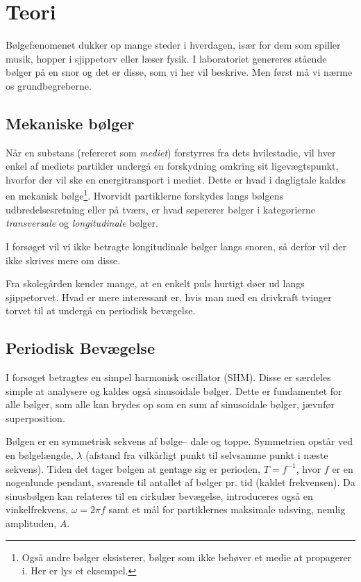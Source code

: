 \documentclass[A2_main.tex]{subfiles}
\begin{document}
\section{Teori}
Bølgefænomenet dukker op mange steder i hverdagen, især for dem som spiller musik, hopper i sjippetorv eller læser fysik. I laboratoriet genereres stående bølger på en snor og det er disse, som vi her vil beskrive. Men først må vi nærme os grundbegreberne.
\subsection{Mekaniske bølger}
Når en substans (refereret som \emph{mediet}) forstyrres fra dets hvilestadie, vil hver enkel af mediets partikler undergå en forskydning omkring sit ligevægtspunkt, hvorfor der vil ske en energitransport i mediet. Dette er hvad i dagligtale kaldes en mekanisk bølge\footnote{Også andre bølger eksisterer, bølger som ikke behøver et medie at propagerer i. Her er lys et eksempel.}. Hvorvidt partiklerne forskydes langs bølgens udbredelsesretning eller på tværs, er hvad sepererer bølger i kategorierne \emph{transversale} og \emph{longitudinale} bølger.

I forsøget vil vi ikke betragte longitudinale bølger langs snoren, så derfor vil der ikke skrives mere om disse.

Fra skolegården kender mange, at en enkelt puls hurtigt døer ud langs sjippetorvet. Hvad er mere interessant er, hvis man med en drivkraft tvinger torvet til at undergå en periodisk bevægelse.

\subsection{Periodisk Bevægelse}
I forsøget betragtes en simpel harmonisk oscillator (SHM). Disse er særdeles simple at analysere og kaldes også sinusoidale bølger. Dette er fundamentet for alle bølger, som alle kan brydes op som en sum af sinusoidale bølger, jævnfør superposition.

Bølgen er en symmetrisk sekvens af bølge-- dale og toppe. Symmetrien opstår ved en bølgelængde, $\lambda$ (afstand fra vilkårligt punkt til selvsamme punkt i næste sekvens). Tiden det tager bølgen at gentage sig er perioden, $T=f^{-1}$, hvor $f$ er en nogenlunde pendant, svarende til antallet af bølger pr. tid (kaldet frekvensen). Da sinusbølgen kan relateres til en cirkulær bevægelse, introduceres også en vinkelfrekvens, $\omega = 2\pi f$ samt et mål for partiklernes maksimale udsving, nemlig amplituden, $A$.
\end{document}

